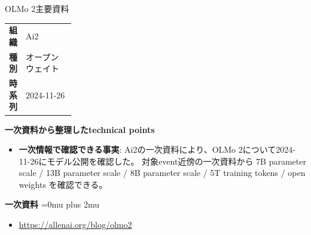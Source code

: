 \begin{technicalnote}{OLMo 2}{主要資料}
\begingroup
\begin{tabularx}{\linewidth}{@{}>{\bfseries}p{0.22\linewidth}X@{}}
組織 & Ai2 \\
種別 & オープンウェイト \\
時系列 & 2024-11-26 \\
\end{tabularx}
\smallskip
{\bfseries 一次資料から整理したtechnical points}
\begin{itemize}[leftmargin=1.5em,itemsep=0.35em]
\item \textbf{一次情報で確認できる事実}: Ai2の一次資料により、OLMo 2について2024-11-26にモデル公開を確認した。 対象event近傍の一次資料から 7B parameter scale / 13B parameter scale / 8B parameter scale / 5T training tokens / open weights を確認できる。
\end{itemize}
\begin{minipage}{\linewidth}
\begin{samepage}
{\bfseries 一次資料}
\begingroup\sloppy
\Urlmuskip=0mu plus 2mu\relax
\begin{itemize}[leftmargin=1.5em,itemsep=0.25em]
\item {\scriptsize\url{https://allenai.org/blog/olmo2}}
\end{itemize}
\endgroup
\end{samepage}
\end{minipage}
\endgroup
\end{technicalnote}
\medskip

